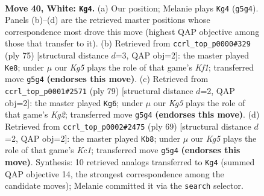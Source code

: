 \documentclass[11pt]{article}
\begin{document}
\clearpage

\begin{figure}[p]\centering
\begin{subfigure}{0.46\textwidth}\centering
\resizebox{\linewidth}{!}{%
\newchessgame
\chessboard[
  setfen={6k1/4R3/8/6K1/p7/P7/7r/8 w - - 4 40},
  showmover=false,
  pgfstyle=straightmove, color=movearrow, markmove={g5-g4}
]}
\caption{}
\end{subfigure}\hfill
\begin{subfigure}{0.46\textwidth}\centering
\resizebox{\linewidth}{!}{%
\newchessgame
\chessboard[
  setfen={5k2/R7/8/6p1/3P4/6P1/7r/3K4 b - - 0 38},
  showmover=false,
  pgfstyle=straightmove, color=movearrow, markmove={f8-e8}
]}
\caption{}
\end{subfigure}
\\[4pt]
\begin{subfigure}{0.46\textwidth}\centering
\resizebox{\linewidth}{!}{%
\newchessgame
\chessboard[
  setfen={2R5/6k1/8/5p2/8/4P1P1/r7/6K1 b - - 0 40},
  showmover=false,
  pgfstyle=straightmove, color=movearrow, markmove={g7-g6}
]}
\caption{}
\end{subfigure}\hfill
\begin{subfigure}{0.46\textwidth}\centering
\resizebox{\linewidth}{!}{%
\newchessgame
\chessboard[
  setfen={2k5/6R1/2p5/p1P5/8/8/7r/1K6 b - - 0 35},
  showmover=false,
  pgfstyle=straightmove, color=movearrow, markmove={c8-b8}
]}
\caption{}
\end{subfigure}
\caption{\textbf{Move 40, White: \texttt{Kg4}.} (a) Our position; Melanie plays \texttt{Kg4} (\texttt{g5g4}). Panels (b)--(d) are the retrieved master positions whose correspondence most drove this move (highest QAP objective among those that transfer to it). (b) Retrieved from \texttt{ccrl\_top\_p0000\#329} (ply 75) [structural distance $d$=3, QAP obj=2]: the master played \texttt{Ke8}; under $\mu$ our \emph{Kg5} plays the role of that game's \emph{Kf1}; transferred move \texttt{g5g4} \textbf{(endorses this move)}. (c) Retrieved from \texttt{ccrl\_top\_p0001\#2571} (ply 79) [structural distance $d$=2, QAP obj=2]: the master played \texttt{Kg6}; under $\mu$ our \emph{Kg5} plays the role of that game's \emph{Kg2}; transferred move \texttt{g5g4} \textbf{(endorses this move)}. (d) Retrieved from \texttt{ccrl\_top\_p0002\#2475} (ply 69) [structural distance $d$=2, QAP obj=2]: the master played \texttt{Kb8}; under $\mu$ our \emph{Kg5} plays the role of that game's \emph{Kc1}; transferred move \texttt{g5g4} \textbf{(endorses this move)}. Synthesis: 10 retrieved analogs transferred to \texttt{Kg4} (summed QAP objective 14, the strongest correspondence among the candidate moves); Melanie committed it via the \texttt{search} selector.}
\label{fig:thought-m78}
\end{figure}
\end{document}
